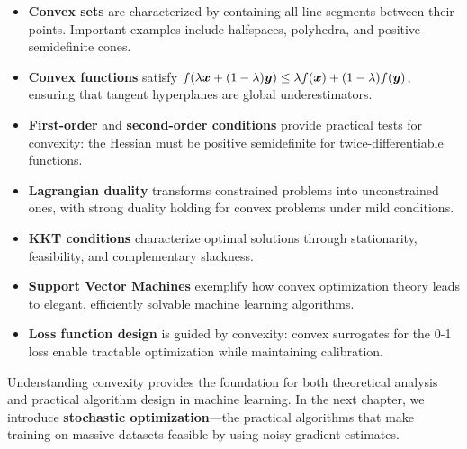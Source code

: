 \documentclass[../../main.tex]{subfiles}
\begin{document}
\begin{itemize}
    \item \textbf{Convex sets} are characterized by containing all line segments between their points. Important examples include halfspaces, polyhedra, and positive semidefinite cones.

    \item \textbf{Convex functions} satisfy $f(\lambda \boldsymbol{x} + (1-\lambda)\boldsymbol{y}) \leq \lambda f(\boldsymbol{x}) + (1-\lambda)f(\boldsymbol{y})$, ensuring that tangent hyperplanes are global underestimators.

    \item \textbf{First-order} and \textbf{second-order conditions} provide practical tests for convexity: the Hessian must be positive semidefinite for twice-differentiable functions.

    \item \textbf{Lagrangian duality} transforms constrained problems into unconstrained ones, with strong duality holding for convex problems under mild conditions.

    \item \textbf{KKT conditions} characterize optimal solutions through stationarity, feasibility, and complementary slackness.

    \item \textbf{Support Vector Machines} exemplify how convex optimization theory leads to elegant, efficiently solvable machine learning algorithms.

    \item \textbf{Loss function design} is guided by convexity: convex surrogates for the 0-1 loss enable tractable optimization while maintaining calibration.
\end{itemize}

Understanding convexity provides the foundation for both theoretical analysis and practical algorithm design in machine learning. In the next chapter, we introduce \textbf{stochastic optimization}---the practical algorithms that make training on massive datasets feasible by using noisy gradient estimates.
\end{document}
